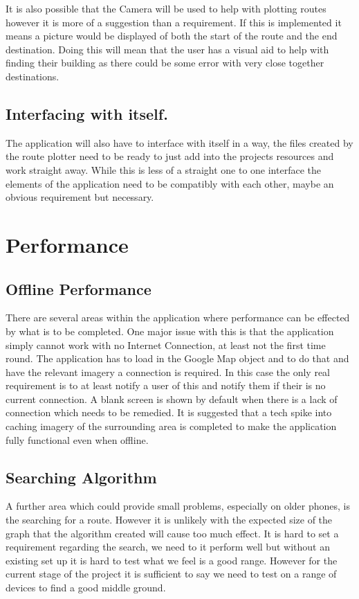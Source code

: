 \documentclass[10pt,a4paper]{article}
\begin{document}
It is also possible that the Camera will be used to help with plotting routes however it is more of a suggestion than a requirement. If this is implemented it means a picture would be displayed of both the start of the route and the end destination. Doing this will mean that the user has a visual aid to help with finding their building as there could be some error with very close together destinations. 
\subsection{Interfacing with itself.}
The application will also have to interface with itself in a way, the files created by the route plotter need to be ready to just add into the projects resources and work straight away. While this is less of a straight one to one interface the elements of the application need to be compatibly with each other, maybe an obvious requirement but necessary. 

\section{Performance}
\subsection{Offline Performance}
There are several areas within the application where performance can be effected by what is to be completed. One major issue with this is that the application simply cannot work with no Internet Connection, at least not the first time round. The application has to load in the Google Map object and to do that and have the relevant imagery a connection is required. In this case the only real requirement is to at least notify a user of this and notify them if their is no current connection. A blank screen is shown by default when there is a lack of connection which needs to be remedied. It is suggested that a tech spike into caching imagery of the surrounding area is completed to make the application fully functional even when offline. 
\subsection{Searching Algorithm}
A further area which could provide small problems, especially on older phones, is the searching for a route. However it is unlikely with the expected size of the graph that the algorithm created will cause too much effect. It is hard to set a requirement regarding the search, we need to it perform well but without an existing set up it is hard to test what we feel is a good range. However for the current stage of the project it is sufficient to say we need to test on a range of devices to find a good middle ground. 
\end{document}
